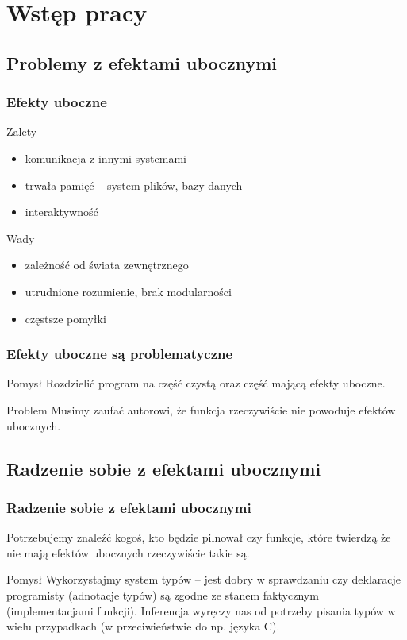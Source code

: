 
\section{Wstęp pracy}

\subsection{Problemy z efektami ubocznymi}

\newcommand\pro{\item[\textcolor{example text.fg}{$+$}]}
\newcommand\con{\item[\alert{$-$}]}

\begin{frame}
  \frametitle{Efekty uboczne}
  \begin{exampleblock}{Zalety}
    \begin{itemize}
      \pro komunikacja z innymi systemami
      \pro trwała pamięć -- system plików, bazy danych
      \pro interaktywność
    \end{itemize}
  \end{exampleblock}
  \begin{alertblock}{Wady}
    \begin{itemize}
      \con zależność od świata zewnętrznego
      \con utrudnione rozumienie, brak modularności
      \con częstsze pomyłki
    \end{itemize}
  \end{alertblock}
\end{frame}

\begin{frame}
  \frametitle{Efekty uboczne są problematyczne}
  \begin{exampleblock}{Pomysł}
    Rozdzielić program na część czystą oraz część mającą efekty uboczne.
  \end{exampleblock}
  \pause
  \vspace{1em}
  \begin{alertblock}{Problem}
    Musimy zaufać autorowi, że funkcja rzeczywiście nie powoduje efektów ubocznych.
  \end{alertblock}
\end{frame}

\subsection{Radzenie sobie z efektami ubocznymi}

\begin{frame}
  \frametitle{Radzenie sobie z efektami ubocznymi}
    Potrzebujemy znaleźć kogoś, kto będzie pilnował czy funkcje, które twierdzą że nie mają efektów ubocznych rzeczywiście takie są.
  \pause
  \begin{exampleblock}{Pomysł}
    Wykorzystajmy system typów -- jest dobry w sprawdzaniu czy deklaracje programisty (adnotacje typów) są zgodne ze stanem faktycznym (implementacjami funkcji). Inferencja wyręczy nas od potrzeby pisania typów w wielu przypadkach (w przeciwieństwie do np. języka C).
  \end{exampleblock}
\end{frame}

